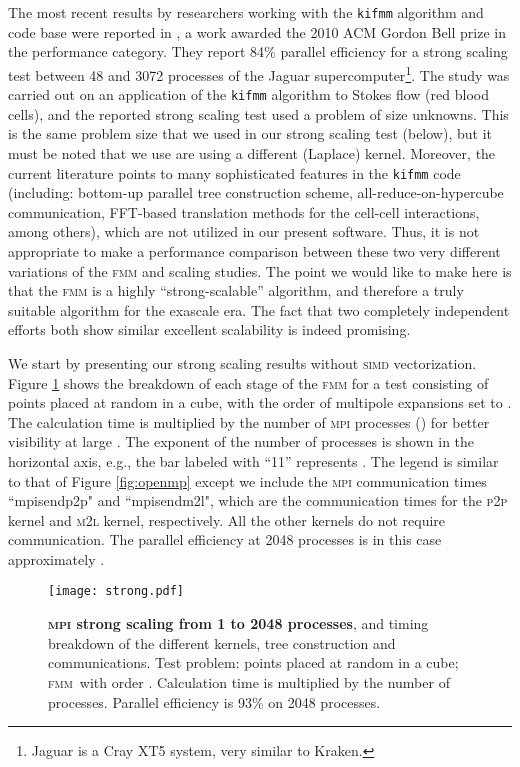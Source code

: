 \documentclass[10pt,twocolumn]{article}
\newcommand{\fmm}{\textsc{fmm}\xspace}
\newcommand{\simd}{\textsc{simd}\xspace}
\newcommand{\mpi}{\textsc{mpi}\xspace}
\newcommand{\ML}{\textsc{m}2\textsc{l}\xspace}
\newcommand{\PP}{\textsc{p}2\textsc{p}\xspace}
\newlength{\up}
\begin{document}
The most recent results by researchers working with the \texttt{kifmm} algorithm and code base were reported in \cite{RahimianETal2010}, a work awarded the 2010 ACM Gordon Bell prize in the performance category. They report 84\% parallel efficiency for a strong scaling test between 48 and 3072 processes of the Jaguar supercomputer\footnote{Jaguar is a Cray XT5 system, very similar to Kraken.}. The study was carried out on an application of the \texttt{kifmm} algorithm to Stokes flow (red blood cells), and the reported strong scaling test used a problem of size  unknowns. This is the same problem size that we used in our strong scaling test (below), but it must be noted that we use are using a different (Laplace) kernel. Moreover, the current literature points to many sophisticated features in the \texttt{kifmm} code (including: bottom-up parallel tree construction scheme, all-reduce-on-hypercube communication, FFT-based translation methods for the cell-cell interactions, among others), which are not utilized in our present software. Thus, it is not appropriate to make a performance comparison between these two very different variations of the \fmm and scaling studies. The point we would like to make here is that the \fmm is a highly ``strong-scalable'' algorithm, and therefore a truly suitable algorithm for the exascale era. The fact that two completely independent efforts both show similar excellent scalability is indeed promising.



We start by presenting our strong scaling results without  \simd vectorization. Figure \ref{fig:strong} shows the breakdown of each stage of the \fmm for a test consisting of  points placed at random in a cube, with the order of multipole expansions set to . The calculation time is multiplied by the number of \mpi processes () for better visibility at large . The exponent of the number of processes is shown in the horizontal axis, e.g., the bar labeled with ``11'' represents . The legend is similar to that of Figure \ref{fig:openmp} except we include the \mpi communication times  ``mpisendp2p" and ``mpisendm2l", which are the communication times for the \PP kernel and \ML kernel, respectively. All the other kernels do not require communication. The parallel efficiency at 2048 processes is in this case approximately .

\begin{figure}[t]
\begin{center}
\texttt{[image: strong.pdf]}
\end{center}
\vspace{-0.5em}\caption{\textbf{\mpi strong scaling from 1 to 2048 processes}, and timing breakdown of the different kernels, tree construction and communications. Test problem:  points placed at random in a cube; \fmm\ with order . Calculation time is multiplied by the number of processes. Parallel efficiency is 93\% on 2048 processes.}
\label{fig:strong}
\end{figure}
\end{document}

